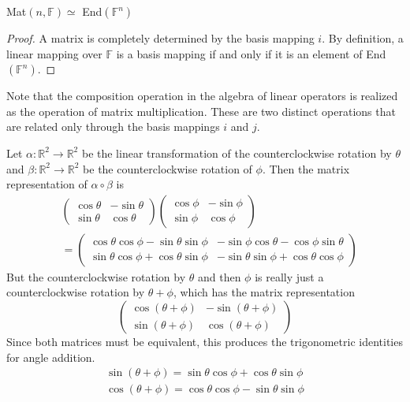   \begin{theorem}
    Mat$(n, \mathbb{F}) \simeq $ End$(\mathbb{F}^n)$ 
  \end{theorem}
  \begin{proof}
    A matrix is completely determined by the basis mapping $i$. By definition, a linear mapping over $\mathbb{F}$ is a basis mapping if and only if it is an element of End$(\mathbb{F}^n)$. 
  \end{proof}

  Note that the composition operation in the algebra of linear operators is realized as the operation of matrix multiplication. These are two distinct operations that are related only through the basis mappings $i$ and $j$. 

  \begin{example}
    Let $\alpha: \mathbb{R}^2 \longrightarrow \mathbb{R}^2$ be the linear transformation of the counterclockwise rotation by $\theta$ and $\beta: \mathbb{R}^2 \longrightarrow \mathbb{R}^2$ be the counterclockwise rotation of $\phi$. Then the matrix representation of $\alpha \circ \beta$ is 
    \begin{align}
        & \begin{pmatrix}
      \cos{\theta} & - \sin{\theta} \\
      \sin{\theta} & \cos{\theta}
      \end{pmatrix} \begin{pmatrix}
      \cos{\phi} & - \sin{\phi} \\
      \sin{\phi} & \cos{\phi} 
      \end{pmatrix} \\
       & = \begin{pmatrix}
      \cos{\theta} \cos{\phi} - \sin{\theta} \sin{\phi} & - \sin{\phi} \cos{\theta} - \cos{\phi} \sin{\theta} \\
      \sin{\theta} \cos{\phi} + \cos{\theta} \sin{\phi} & - \sin{\theta} \sin{\phi} + \cos{\theta} \cos{\phi}
      \end{pmatrix}
    \end{align}
    But the counterclockwise rotation by $\theta$ and then $\phi$ is really just a counterclockwise rotation by $\theta + \phi$, which has the matrix representation
    \begin{equation}
      \begin{pmatrix}
      \cos{(\theta + \phi)} & - \sin{(\theta + \phi)} \\
      \sin{(\theta + \phi)} & \cos{(\theta + \phi)}
      \end{pmatrix}
    \end{equation}
    Since both matrices must be equivalent, this produces the trigonometric identities for angle addition.
    \begin{align*}
      \sin{(\theta + \phi)} = \sin{\theta} \cos{\phi} + \cos{\theta} \sin{\phi} \\
      \cos{(\theta + \phi)} = \cos{\theta} \cos{\phi} - \sin{\theta} \sin{\phi}
    \end{align*}
  \end{example}

